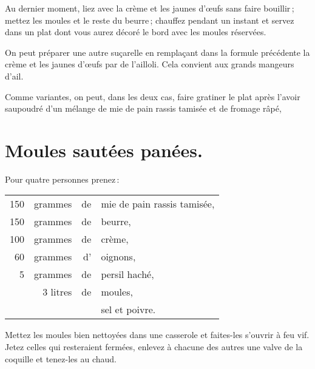 Au dernier moment, liez avec la crème et les jaunes d'œufs sans faire
bouillir ; mettez les moules et le reste du beurre ; chauffez pendant un
instant et servez dans un plat dont vous aurez décoré le bord avec les moules
réservées.

\sk

On peut préparer une autre suçarelle en remplaçant dans la formule précédente
la crème et les jaunes d'œufs par de l'ailloli. Cela convient aux grands
mangeurs d'ail.

\sk

Comme variantes, on peut, dans les deux cas, faire gratiner le plat après
l'avoir saupoudré d'un mélange de mie de pain rassis tamisée et de fromage
râpé,

\section*{\centering Moules sautées panées.}

Pour quatre personnes prenez :

\footnotesize
\begin{longtable}{rrrp{16em}}
    150 & grammes & de & mie de pain rassis tamisée,                                                      \\
    150 & grammes & de & beurre,                                                                          \\
    100 & grammes & de & crème,                                                                           \\
     60 & grammes & d' & oignons,                                                                         \\
      5 & grammes & de & persil haché,                                                                    \\
        & 3 litres& de & moules,                                                                          \\
        &         &    & sel et poivre.                                                                   \\
\end{longtable}
\normalsize

Mettez les moules bien nettoyées dans une casserole et faites-les s'ouvrir
à feu vif. Jetez celles qui resteraient fermées, enlevez à chacune des autres
une valve de la coquille et tenez-les au chaud.

